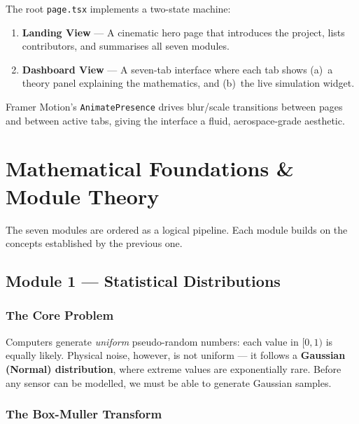 \documentclass[12pt, a4paper]{article}
\begin{document}
The root \texttt{page.tsx} implements a two-state machine:

\begin{enumerate}[label=\arabic*.]
  \item \textbf{Landing View} --- A cinematic hero page that introduces the project,
        lists contributors, and summarises all seven modules.
  \item \textbf{Dashboard View} --- A seven-tab interface where each tab shows (a)~a
        theory panel explaining the mathematics, and (b)~the live simulation widget.
\end{enumerate}

Framer Motion's \texttt{AnimatePresence} drives blur/scale transitions between pages
and between active tabs, giving the interface a fluid, aerospace-grade aesthetic.

\section{Mathematical Foundations \& Module Theory}

The seven modules are ordered as a logical pipeline. Each module builds on the concepts
established by the previous one.

\subsection{Module 1 --- Statistical Distributions}

\subsubsection{The Core Problem}

Computers generate \emph{uniform} pseudo-random numbers: each value in $[0, 1)$ is
equally likely. Physical noise, however, is not uniform --- it follows a
\textbf{Gaussian (Normal) distribution}, where extreme values are exponentially rare.
Before any sensor can be modelled, we must be able to generate Gaussian samples.

\subsubsection{The Box-Muller Transform}
\end{document}
